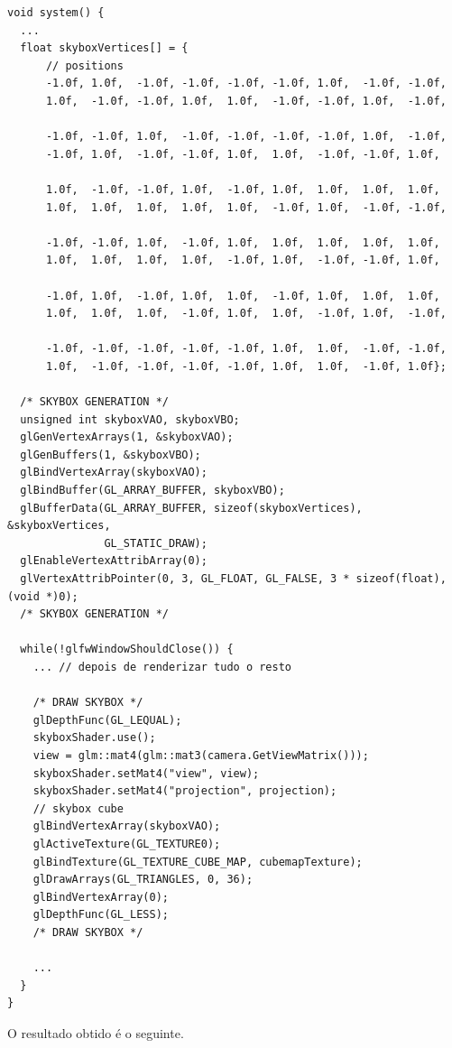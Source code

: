 \enlargethispage{1in}
\begin{lstlisting}[style=Cpp, caption=\textit{Cubemap} para a \textit{Skybox}]
void system() {
  ...
  float skyboxVertices[] = {
      // positions
      -1.0f, 1.0f,  -1.0f, -1.0f, -1.0f, -1.0f, 1.0f,  -1.0f, -1.0f,
      1.0f,  -1.0f, -1.0f, 1.0f,  1.0f,  -1.0f, -1.0f, 1.0f,  -1.0f,

      -1.0f, -1.0f, 1.0f,  -1.0f, -1.0f, -1.0f, -1.0f, 1.0f,  -1.0f,
      -1.0f, 1.0f,  -1.0f, -1.0f, 1.0f,  1.0f,  -1.0f, -1.0f, 1.0f,

      1.0f,  -1.0f, -1.0f, 1.0f,  -1.0f, 1.0f,  1.0f,  1.0f,  1.0f,
      1.0f,  1.0f,  1.0f,  1.0f,  1.0f,  -1.0f, 1.0f,  -1.0f, -1.0f,

      -1.0f, -1.0f, 1.0f,  -1.0f, 1.0f,  1.0f,  1.0f,  1.0f,  1.0f,
      1.0f,  1.0f,  1.0f,  1.0f,  -1.0f, 1.0f,  -1.0f, -1.0f, 1.0f,

      -1.0f, 1.0f,  -1.0f, 1.0f,  1.0f,  -1.0f, 1.0f,  1.0f,  1.0f,
      1.0f,  1.0f,  1.0f,  -1.0f, 1.0f,  1.0f,  -1.0f, 1.0f,  -1.0f,

      -1.0f, -1.0f, -1.0f, -1.0f, -1.0f, 1.0f,  1.0f,  -1.0f, -1.0f,
      1.0f,  -1.0f, -1.0f, -1.0f, -1.0f, 1.0f,  1.0f,  -1.0f, 1.0f};

  /* SKYBOX GENERATION */
  unsigned int skyboxVAO, skyboxVBO;
  glGenVertexArrays(1, &skyboxVAO);
  glGenBuffers(1, &skyboxVBO);
  glBindVertexArray(skyboxVAO);
  glBindBuffer(GL_ARRAY_BUFFER, skyboxVBO);
  glBufferData(GL_ARRAY_BUFFER, sizeof(skyboxVertices), &skyboxVertices,
               GL_STATIC_DRAW);
  glEnableVertexAttribArray(0);
  glVertexAttribPointer(0, 3, GL_FLOAT, GL_FALSE, 3 * sizeof(float), (void *)0);
  /* SKYBOX GENERATION */

  while(!glfwWindowShouldClose()) {
    ... // depois de renderizar tudo o resto

    /* DRAW SKYBOX */
    glDepthFunc(GL_LEQUAL);
    skyboxShader.use();
    view = glm::mat4(glm::mat3(camera.GetViewMatrix()));
    skyboxShader.setMat4("view", view);
    skyboxShader.setMat4("projection", projection);
    // skybox cube
    glBindVertexArray(skyboxVAO);
    glActiveTexture(GL_TEXTURE0);
    glBindTexture(GL_TEXTURE_CUBE_MAP, cubemapTexture);
    glDrawArrays(GL_TRIANGLES, 0, 36);
    glBindVertexArray(0);
    glDepthFunc(GL_LESS);
    /* DRAW SKYBOX */

    ...
  }
}
\end{lstlisting}

\noindent
O resultado obtido é o seguinte.

